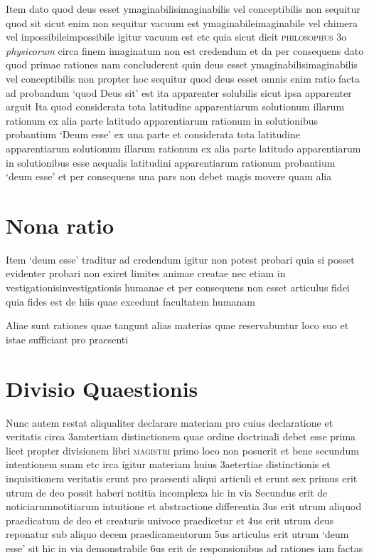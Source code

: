 \documentclass[twoside, openright]{report}
\newcommand{\name}[1]{\textsc{#1}}
\newcommand{\worktitle}[1]{\textit{#1}}
\begin{document}
        \pstart
        Item dato quod deus esset ymaginabilisimaginabilis vel conceptibilis non sequitur quod sit sicut enim non sequitur  vacuum est ymaginabileimaginabile vel chimera vel inpossibileimpossibile igitur vacuum est etc quia sicut dicit \name{philosophus} 3o \worktitle{physicorum} circa finem imaginatum non est credendum et da per consequens dato quod primae rationes nam concluderent quin deus esset ymaginabilisimaginabilis vel conceptibilis non propter hoc sequitur quod deus esset omnis enim ratio facta ad probandum \enquote*{quod Deus sit} est ita apparenter solubilis sicut ipsa apparenter arguit Ita quod considerata tota latitudine apparentiarum solutionum illarum rationum ex alia parte latitudo apparentiarum rationum in solutionibus probantium \enquote*{Deum esse} ex una parte et considerata tota latitudine apparentiarum solutionum illarum rationum ex alia parte  latitudo apparentiarum in solutionibus esse aequalis latitudini apparentiarum rationum probantium \enquote*{deum esse} et per consequens una pars non debet magis movere quam alia
        \pend
      
        \bigskip
         \section*{Nona ratio} 
        \pstart
        Item \enquote*{deum esse} traditur ad credendum igitur non potest probari quia si posset evidenter probari non exiret limites animae creatae nec etiam in vestigationisinvestigationis humanae et per consequens non esset articulus fidei quia fides est de hiis quae excedunt facultatem humanam
        \pend
      
        \bigskip
         
        \pstart
        Aliae sunt rationes quae tangunt alias materias quae reservabuntur loco suo et istae sufficiant pro praesenti
        \pend
       
        \bigskip
         \section*{Divisio Quaestionis} 
        \pstart
        Nunc autem restat aliqualiter declarare materiam pro cuius declaratione et veritatis circa 3amtertiam distinctionem quae ordine doctrinali debet esse prima licet propter divisionem libri \name{magistri} primo loco non posuerit et bene secundum intentionem suam etc irca igitur materiam huius 3aetertiae distinctionis et inquisitionem veritatis erunt  pro praesenti aliqui articuli et erunt sex primus erit utrum de deo possit haberi notitia incomplexa hic in via  Secundus erit de noticiarumnotitiarum intuitione et abstractione  differentia 3us erit utrum aliquod praedicatum de deo et creaturis univoce praedicetur  et 4us erit utrum deus reponatur sub aliquo decem praedicamentorum  5us articulus erit  utrum \enquote*{deum esse} sit hic in via demonstrabile  6us erit de responsionibus ad rationes iam factas
        \pend
      
\end{document}
